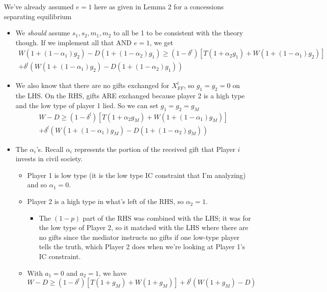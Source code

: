 \documentclass[12pt]{article}
\newcommand{\al}{\alpha}
\newcommand{\de}{\delta}
\begin{document}
We've already assumed $e=1$ here as given in Lemma 2 for a concessions separating equilibrium 
	\begin{itemize}
		\item We \textit{should} assume $s_1,s_2,m_1,m_2$ to all be 1 to be consistent with the theory though. If we implement all that AND $e=1$, we get
			\begin{multline*}
					W\left(1 + \left(1-\al_1\right)g_2\right)-D\left(1 + \left(1-\al_2\right)g_1\right) \geq \left(1-\de^l\right) \left[T\left(1 + \al_2g_1\right) + W\left(1 + \left(1-\al_1\right)g_2\right) \right] \\
						+ \de^l \left(W\left(1 + \left(1-\al_1\right)g_2\right)-D\left(1 + \left(1-\al_2\right)g_1\right)\right)
			\end{multline*}
		\item We also know that there are no gifts exchanged for $X^l_{FF}$, so $g_1 = g_2 = 0$ on the LHS. On the RHS, gifts ARE exchanged because player 2 is a high type and the low type of player 1 lied. So we can set $g_1 = g_2 = g_M$
			\begin{multline*}
					W - D \geq \left(1-\de^l\right) \left[ T\left(1 + \al_2g_M\right) + W\left(1 + \left(1-\al_1\right)g_M\right) \right] \\
					+ \de^l \left(W\left(1 + \left(1-\al_1\right)g_M\right)-D\left(1 + \left(1-\al_2\right)g_M\right)\right)
			\end{multline*}
		\item The $\al_i$'s. Recall $\al_i$ represents the portion of the received gift that Player $i$ invests in civil society.
			\begin{itemize}
				\item Player 1 is low type (it is the low type IC constraint that I'm analyzing) and so $\al_1 = 0$.
				\item Player 2 is a high type in what's left of the RHS, so $\al_2 = 1$.
					\begin{itemize}
						\item The $(1-p)$ part of the RHS was combined with the LHS; it was for the low type of Player 2, so it matched with the LHS where there are no gifts since the mediator instructs no gifts if one low-type player tells the truth, which Player 2 does when we're looking at Player 1's IC constraint.
					\end{itemize}
				\item With $a_1 = 0$ and $a_2 = 1$, we have
					\begin{equation}
							W - D \geq \left(1-\de^l\right) \left[ T\left(1 + g_M\right) + W\left(1 + g_M\right) \right] + \de^l \left(W\left(1 + g_M\right)-D\right)
							\label{eqn:alphas}
					\end{equation}
			\end{itemize}
				

\end{itemize}
\end{document}
